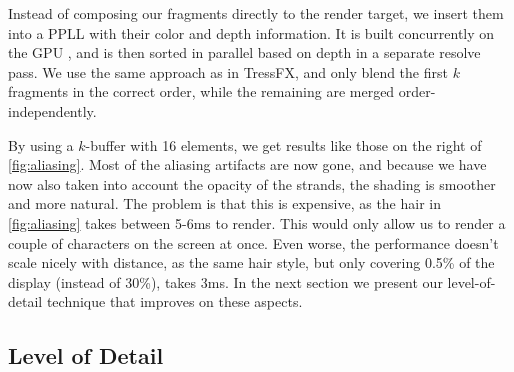 \documentclass{egpubl}
\begin{document}

Instead of composing our fragments directly to the render target, we insert them into a PPLL with their color and depth information. It is built concurrently on the GPU \cite{yang2010real}, and is then sorted in parallel based on depth in a separate resolve pass. We use the same approach as in TressFX, and only blend the first $k$ fragments in the correct order, while the remaining are merged order-independently.


By using a $k$-buffer with 16 elements, we get results like those on the right of \cref{fig:aliasing}. Most of the aliasing artifacts are now gone, and because we have now also taken into account the opacity of the strands, the shading is smoother and more natural. The problem is that this is expensive, as the hair in \cref{fig:aliasing} takes between 5-6ms to render. This would only allow us to render a couple of characters on the screen at once. Even worse, the performance doesn't scale nicely with distance, as the same hair style, but only covering 0.5\% of the display (instead of 30\%), takes 3ms. In the next section we present our level-of-detail technique that improves on these aspects.

\subsection{Level of Detail} \label{sec:level_of_detail}

\end{document}
